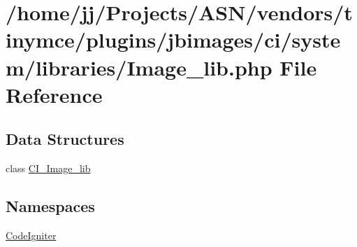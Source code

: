 \hypertarget{_image__lib_8php}{}\section{/home/jj/\+Projects/\+A\+S\+N/vendors/tinymce/plugins/jbimages/ci/system/libraries/\+Image\+\_\+lib.php File Reference}
\label{_image__lib_8php}
\subsection*{Data Structures}
\begin{DoxyCompactItemize}
\item 
class \hyperlink{class_c_i___image__lib}{C\+I\+\_\+\+Image\+\_\+lib}
\end{DoxyCompactItemize}
\subsection*{Namespaces}
\begin{DoxyCompactItemize}
\item 
 \hyperlink{namespace_code_igniter}{Code\+Igniter}
\end{DoxyCompactItemize}
